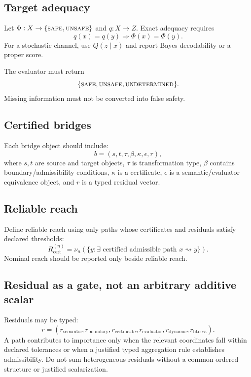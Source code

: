 \documentclass[11pt]{article}
\newcommand{\safe}{\textsc{safe}}
\newcommand{\unsafe}{\textsc{unsafe}}
\newcommand{\undetermined}{\textsc{undetermined}}
\newcommand{\cert}{\mathrm{cert}}
\begin{document}
\subsection{Target adequacy}

Let $\Phi:X\to\{\safe,\unsafe\}$ and $q:X\to Z$. Exact adequacy requires
\begin{equation}
q(x)=q(y)\Longrightarrow\Phi(x)=\Phi(y).
\end{equation}
For a stochastic channel, use $Q(z\mid x)$ and report Bayes decodability or a proper score.

The evaluator must return
\begin{equation}
\{\safe,\unsafe,\undetermined\}.
\end{equation}
Missing information must not be converted into false safety.

\subsection{Certified bridges}

Each bridge object should include:
\begin{equation}
b=(s,t,\tau,\beta,\kappa,\epsilon,r),
\end{equation}
where $s,t$ are source and target objects, $\tau$ is transformation type, $\beta$ contains boundary/admissibility
conditions, $\kappa$ is a certificate, $\epsilon$ is a semantic/evaluator equivalence object, and $r$ is a typed residual
vector.

\subsection{Reliable reach}

Define reliable reach using only paths whose certificates and residuals satisfy declared thresholds:
\begin{equation}
R_{\cert}^{(n)}
=
\nu_n\left(\{y:\exists\text{ certified admissible path }x\rightsquigarrow y\}\right).
\end{equation}
Nominal reach should be reported only beside reliable reach.

\subsection{Residual as a gate, not an arbitrary additive scalar}

Residuals may be typed:
\begin{equation}
r=(r_{\mathrm{semantic}},r_{\mathrm{boundary}},r_{\mathrm{certificate}},r_{\mathrm{evaluator}},r_{\mathrm{dynamic}},r_{\mathrm{fitness}}).
\end{equation}
A path contributes to importance only when the relevant coordinates fall within declared tolerances or when a
justified typed aggregation rule establishes admissibility. Do not sum heterogeneous residuals without a common
ordered structure or justified scalarization.
\end{document}
